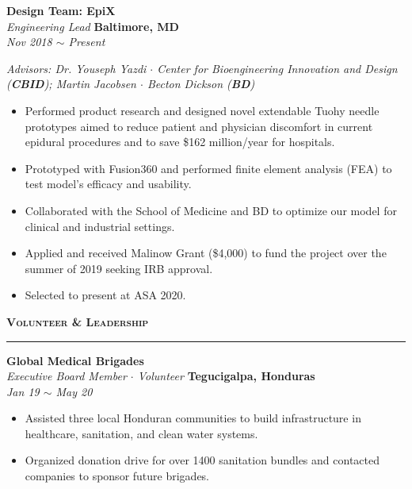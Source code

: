 \documentclass[10pt, letterpaper]{article}
\begin{document}
\begin{paracol}{2}
	\textbf{Design Team: EpiX}\\
	\textit{Engineering Lead}
	\switchcolumn
	\raggedleft\textbf{Baltimore, MD}\\
	\raggedleft\textit{Nov 2018 $\sim$ Present}
\end{paracol}\vspace{-1mm}
\textit{Advisors: Dr. Youseph Yazdi $\cdot$ Center for Bioengineering Innovation and
Design (\textbf{CBID}); Martin Jacobsen $\cdot$ Becton Dickson (\textbf{BD})}
\vspace{-2mm}
\begin{itemize}
	\item Performed product research and designed novel extendable Tuohy needle 
	prototypes aimed to reduce patient and 
	physician discomfort in current epidural procedures and to save \$162 million/year for 
	hospitals.\vspace{-3mm}
	\item Prototyped with Fusion360 and performed finite
	element analysis (FEA) to test model's efficacy and usability.\vspace{-3mm}
	\item Collaborated with the School of Medicine and BD to optimize our
	model for clinical and industrial settings.\vspace{-3mm}
	\item Applied and received Malinow Grant (\$4,000) to fund the project over 
	the summer of 2019 seeking IRB approval.\vspace{-3mm}
	\item Selected to present at ASA 2020. 
\end{itemize}

{\large \textbf{\textsc{Volunteer \& Leadership}}}
\vspace{5pt}
\hrule

\begin{paracol}{2}
	\textbf{Global Medical Brigades}\\
	\textit{Executive Board Member $\cdot$ Volunteer}
	\switchcolumn
	\raggedleft\textbf{Tegucigalpa, Honduras}\\
	\raggedleft\textit{Jan 19 $\sim$ May 20}
\end{paracol}\vspace{-1mm}
\vspace{-2mm}
\begin{itemize}
	\item Assisted three local Honduran communities to build infrastructure in healthcare, sanitation, and clean water systems.\vspace{-3mm}
	\item Organized donation drive for over 1400 sanitation bundles and contacted companies to sponsor future brigades.
\end{itemize}
\vspace{-2mm}
\end{document}
